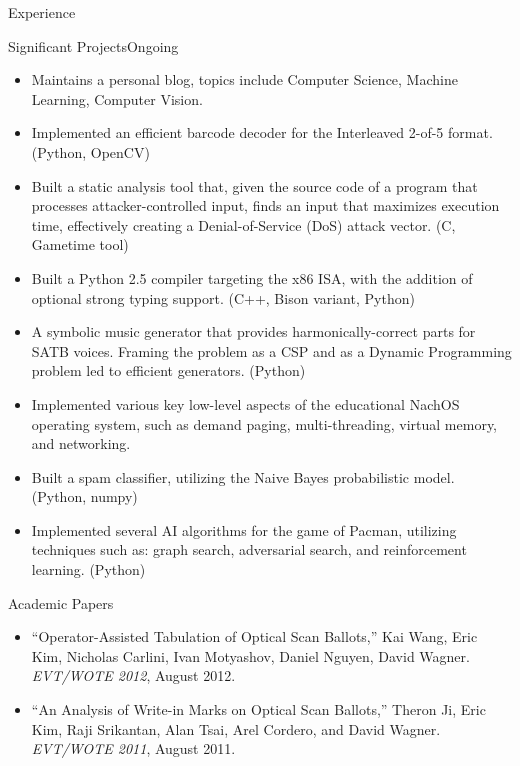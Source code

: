 \documentclass{resume}
\begin{document}
\begin{component}{Experience}
\begin{position}{Significant Projects}{Ongoing}
	\begin{itemize}
        \vspace{-0.5em}\item Maintains a personal blog, topics include 
        Computer Science, Machine Learning, Computer Vision.
	        \vspace{-0.5em}\item Implemented an efficient barcode decoder
	        for the Interleaved 2-of-5 format. (Python, OpenCV)
		\vspace{-0.5em}\item Built a static analysis tool that, given the source code of a program that
		processes attacker-controlled input, finds an input that maximizes execution time, effectively
		creating a Denial-of-Service (DoS) attack vector. (C, Gametime tool)
		\vspace{-0.5em}\item Built a Python 2.5 compiler targeting the x86 ISA, with the addition of
		optional strong typing support. (C++, Bison variant, Python)
		\vspace{-0.5em}\item A symbolic music generator that provides harmonically-correct
		parts for SATB voices. Framing the problem as a CSP and as a Dynamic Programming problem led to efficient generators.
		(Python)
		\vspace{-0.5em}\item Implemented various key low-level aspects of the 
		educational NachOS operating system, such as demand paging, multi-threading, virtual memory, and 
		networking.
		\vspace{-0.5em}\item Built a spam classifier, utilizing the Naive Bayes probabilistic model. (Python, numpy)
		\vspace{-0.5em}\item Implemented several AI algorithms for the game of Pacman, utilizing
		techniques such as: graph search, adversarial search, and reinforcement learning. (Python)
	\end{itemize}
	\end{position}
\end{component}

\vspace{-1.0em}

\begin{component}{Academic Papers}
	\begin{itemize}
                \item[] ``Operator-Assisted Tabulation of Optical Scan Ballots,'' Kai Wang, Eric Kim, Nicholas Carlini, Ivan Motyashov, Daniel Nguyen, David Wagner. \emph{EVT/WOTE 2012}, August 2012.
		\item[] ``An Analysis of Write-in Marks on Optical Scan Ballots,'' Theron Ji, Eric Kim, Raji Srikantan, Alan Tsai, Arel Cordero, and David Wagner. \emph{EVT/WOTE 2011}, August 2011.
	\end{itemize}
\end{component}
\end{document}
